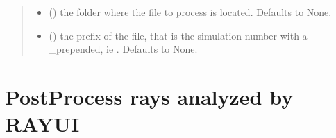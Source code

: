 \documentclass[letterpaper,10pt,english]{sphinxmanual}
\begin{document}
\begin{fulllineitems}
\begin{fulllineitems}
\begin{quote}
\begin{description}
\begin{itemize}
\item {} 
\sphinxAtStartPar
{} (\sphinxstyleliteralemphasis{\sphinxupquote{, }}) \textendash{} the folder where the file to process is located. Defaults to None.

\item {} 
\sphinxAtStartPar
{} (\sphinxstyleliteralemphasis{\sphinxupquote{, }}) \textendash{} the prefix of the file, that is the simulation number with a \_prepended, ie . Defaults to None.

\end{itemize}

\end{description}\end{quote}

\end{fulllineitems}


\end{fulllineitems}



\section{PostProcess rays analyzed by RAY\sphinxhyphen{}UI}
\label{\detokenize{code_documentation:postprocess-rays-analyzed-by-ray-ui}}
\end{document}
